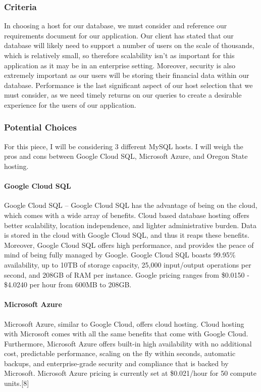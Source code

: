 \documentclass[onecolumn, draftclsnofoot,10pt, compsoc]{IEEEtran}
\begin{document}
\subsubsection{Criteria}
In choosing a host for our database, we must consider and reference our requirements document for our application. Our client has stated that our database will likely need to support a number of users on the scale of thousands, which is relatively small, so therefore scalability isn't as important for this application as it may be in an enterprise setting. Moreover, security is also extremely important as our users will be storing their financial data within our database. Performance is the last significant aspect of our host selection that we must consider, as we need timely returns on our queries to create a desirable experience for the users of our application.

\subsubsection{Potential Choices }
For this piece, I will be considering 3 different MySQL hosts. I will weigh the pros and cons between Google Cloud SQL, Microsoft Azure, and Oregon State hosting.

\paragraph{Google Cloud SQL}
Google Cloud SQL – Google Cloud SQL has the advantage of being on the cloud, which comes with a wide array of benefits. Cloud based database hosting offers better scalability, location independence, and lighter administrative burden. Data is stored in the cloud with Google Cloud SQL, and thus it reaps these benefits. Moreover, Google Cloud SQL offers high performance, and provides the peace of mind of being fully managed by Google. Google Cloud SQL boasts 99.95\% availability, up to 10TB of storage capacity, 25,000 input/output operations per second, and 208GB of RAM per instance. Google pricing ranges from \$0.0150 - \$4.0240 per hour from 600MB to 208GB.

\paragraph{Microsoft Azure}
Microsoft Azure, similar to Google Cloud, offers cloud hosting. Cloud hosting with Microsoft comes with all the same benefits that come with Google Cloud.  Furthermore, Microsoft Azure offers built-in high availability with no additional cost, predictable performance, scaling on the fly within seconds, automatic backups, and enterprise-grade security and compliance that is backed by Microsoft. Microsoft Azure pricing is currently set at \$0.021/hour for 50 compute units.[8]
\end{document}
